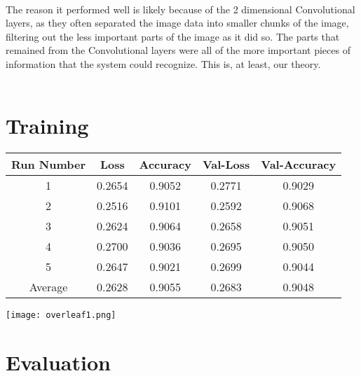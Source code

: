 \documentclass[11pt]{article}
\begin{document}
\\
The reason it performed well is likely because of the 2 dimensional Convolutional layers, as they often separated the image data into smaller chunks of the image, filtering out the less important parts of the image as it did so. The parts that remained from the Convolutional layers were all of the more important pieces of information that the system could recognize. This is, at least, our theory.\\
\\
\section{Training}


\begin{table}[h]
\begin{center}
\begin{tabular}{|c|c|c|c|c|} \hline
{\bf Run Number} & {\bf Loss} & {\bf Accuracy} & {\bf Val-Loss} & {\bf Val-Accuracy}\\ \hline
1 & 0.2654 & 0.9052 & 0.2771 & 0.9029 \\
\hline
2 & 0.2516 & 0.9101 & 0.2592 & 0.9068 \\
\hline
3 & 0.2624 & 0.9064 & 0.2658 & 0.9051 \\
\hline
4 & 0.2700 & 0.9036 & 0.2695 & 0.9050 \\
\hline
5 & 0.2647 & 0.9021 & 0.2699 & 0.9044 \\
\hline
Average & 0.2628 & 0.9055 & 0.2683 & 0.9048 \\
\hline
\end{tabular}
\label{params}
\end{center}
\end{table}


\texttt{[image: overleaf1.png]}

\section{Evaluation}

\end{document}
